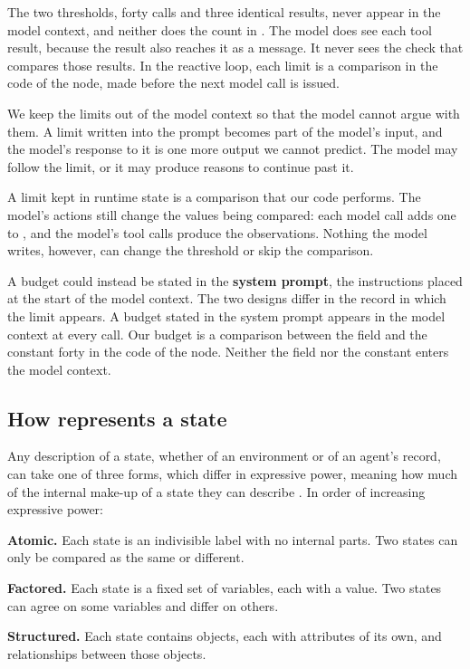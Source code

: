 The two thresholds, forty calls and three identical results, never appear in the model context,
and neither does the count in . The model does see each tool result, because the
result also reaches it as a message. It never sees the check that compares those results. In the
reactive loop, each limit is a comparison in the code of the  node, made before
the next model call is issued.

We keep the limits out of the model context so that the model cannot argue with them. A limit
written into the prompt becomes part of the model's input, and the model's response to it is one
more output we cannot predict. The model may follow the limit, or it may produce reasons to continue
past it.

A limit kept in runtime state is a comparison that our code performs. The model's actions still
change the values being compared: each model call adds one to , and the
model's tool calls produce the observations. Nothing the model writes, however, can change the
threshold or skip the comparison.

A budget could instead be stated in the \textbf{system prompt}, the instructions placed at the start
of the model context. The two designs differ in the record in which the limit appears. A budget
stated in the system prompt appears in the model context at every call. Our budget is a comparison between the field  and
the constant forty in the code of the  node. Neither the field nor the constant
enters the model context.

\subsection{How \texorpdfstring{\msa{}}{mini-swe-agent} represents a state}
\label{sec:state-representations}

Any description of a state, whether of an environment or of an agent's record, can take one of
three forms, which differ in expressive power, meaning how much of the internal make-up of a state
they can describe \citep[\S2.4.7]{russell2020aima}. In order of increasing expressive power:
\bi
\item \textbf{Atomic.} Each state is an indivisible label with no internal parts. Two states can
only be compared as the same or different.
\item \textbf{Factored.} Each state is a fixed set of variables, each with a value. Two states can
agree on some variables and differ on others.
\item \textbf{Structured.} Each state contains objects, each with attributes of its own, and
relationships between those objects.
\ei

